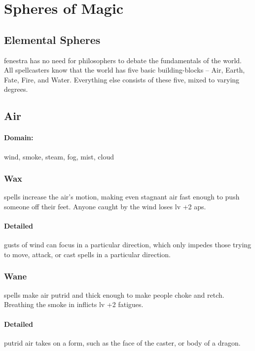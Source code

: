\section{Spheres of Magic}

\begin{multicols}{2}

\subsection{Elemental Spheres}

\Gls{fenestra} has no need for philosophers to debate the fundamentals of the world.
All spellcasters know that the world has five basic building-blocks -- Air, Earth, Fate, Fire, and Water.
Everything else consists of these five, mixed to varying degrees.

\subsection{Air}
\paragraph{Domain:}
wind, smoke, steam, fog, mist, cloud

\subsubsection{Wax}
spells increase the air's motion, making even stagnant air fast enough to push someone off their feet.
Anyone caught by the wind loses \gls{lv} +2 \glspl{ap}.

\paragraph{Detailed}
gusts of wind can focus in a particular direction, which only impedes those trying to move, attack, or cast spells in a particular direction.

\subsubsection{Wane}
spells make air putrid and thick enough to make people choke and retch.
Breathing the smoke in inflicts \gls{lv} +2 \glspl{fatigue}.

\paragraph{Detailed}
putrid air takes on a form, such as the face of the caster, or body of a dragon.


\end{multicols}
